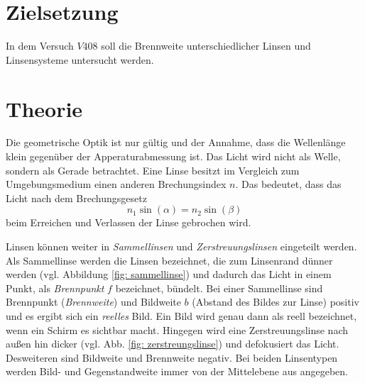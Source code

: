 \setcounter{page}{1}
\section*{Zielsetzung}
In dem Versuch $V408$ soll die Brennweite unterschiedlicher Linsen und
Linsensysteme untersucht werden.
\section{Theorie}
Die geometrische Optik ist nur gültig und der Annahme, dass die Wellenlänge klein
gegenüber der Apperaturabmessung ist. Das Licht wird nicht als Welle, sondern als
Gerade betrachtet.  %
Eine Linse besitzt im Vergleich zum Umgebungsmedium einen anderen Brechungsindex $n$.
Das bedeutet, dass das Licht nach dem Brechungsgesetz
\begin{equation*}
  n_1\sin(\alpha)=n_2\sin(\beta)
\end{equation*}
beim Erreichen und Verlassen der Linse gebrochen wird. %

Linsen können weiter in \emph{Sammellinsen} und \emph{Zerstreuungslinsen} %
eingeteilt werden. Als Sammellinse werden die Linsen bezeichnet, die zum Linsenrand %
dünner werden (vgl. Abbildung \ref{fig: sammellinse}) und dadurch das Licht in einem Punkt, als \emph{Brennpunkt} $f$ bezeichnet,
bündelt.
Bei einer Sammellinse sind Brennpunkt (\emph{Brennweite}) %
und Bildweite $b$ (Abstand des Bildes zur Linse) positiv und es ergibt sich ein
\emph{reelles} Bild. Ein Bild wird genau dann als reell bezeichnet, wenn
ein Schirm es sichtbar macht.
Hingegen wird eine Zerstreuungslinse nach außen hin dicker (vgl. Abb. \ref{fig: zerstreungslinse}) und
defokusiert das Licht. Desweiteren sind Bildweite und Brennweite negativ.
Bei beiden Linsentypen werden Bild- und Gegenstandweite immer von der Mittelebene
aus angegeben.

